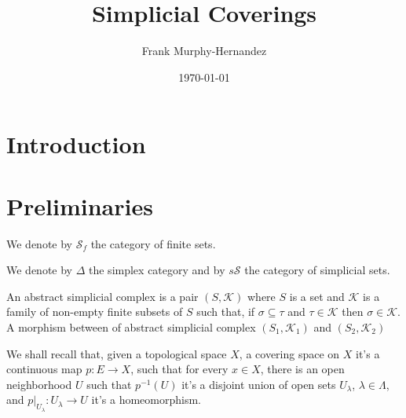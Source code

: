 \documentclass{amsart}
\begin{document}
\title{Simplicial Coverings}

\author{Frank Murphy-Hernandez}
\address{Facultad de Ciencias, UNAM, Mexico City}


\date{\today}


\begin{abstract}

\end{abstract}

\maketitle

\section*{Introduction}



\section{Preliminaries}

We denote by $\mathcal{S}_f$ the category of finite sets.

We denote by $\Delta$ the simplex category and by $s\mathcal{S}$ the category of simplicial sets.

\cite{goerss2009simplicial}
\cite{may1992simplicial}

An abstract simplicial complex is a pair $(S,\mathcal{K})$ where $S$ is a set and $\mathcal{K}$ is a family of non-empty finite subsets of $S$ such that, if $\sigma\subseteq \tau$ and $\tau\in \mathcal{K}$ then $\sigma\in\mathcal{K}$. A morphism between of abstract simplicial complex $(S_1,\mathcal{K}_1)$ and $(S_2,\mathcal{K}_2)$

We shall recall that, given a topological space $X$, a covering space on $X$ it's a continuous map $p\colon E\to X$, such that for every $x\in X$, there is an open neighborhood $U$ such that $p^{-1}(U)$ it's a disjoint union of open sets $U_{\lambda}$, $\lambda\in\Lambda$, and $p|_{U_{\lambda}}\colon U_{\lambda}\to U$ it's a homeomorphism.

\end{document}
